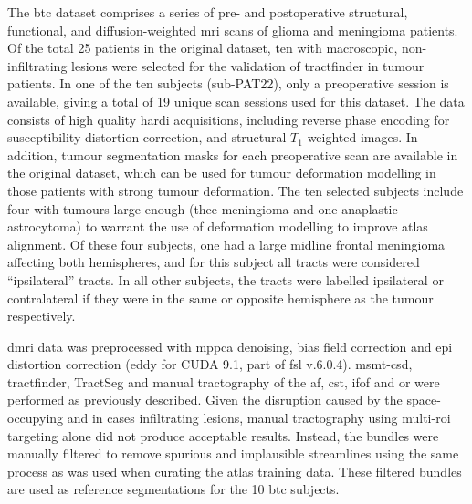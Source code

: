 The \gls{btc} dataset\autocite{Aerts2020a,Aerts2022a,Aerts2022} comprises a series of pre- and postoperative structural, functional, and diffusion-weighted \gls{mri} scans of glioma and meningioma patients.
Of the total 25 patients in the original dataset, ten with macroscopic, non-infiltrating lesions were selected for the validation of tractfinder in tumour patients.
In one of the ten subjects (sub-PAT22), only a preoperative session is available, giving a total of 19 unique scan sessions used for this dataset.
The data consists of high quality \gls{hardi} acquisitions, including reverse phase encoding for susceptibility distortion correction, and structural $T_1$-weighted images.
In addition, tumour segmentation masks for each preoperative scan are available in the original dataset, which can be used for tumour deformation modelling in those patients with strong tumour deformation.
The ten selected subjects include four with tumours large enough (thee meningioma and one anaplastic astrocytoma) to warrant the use of deformation modelling to improve atlas alignment.
Of these four subjects, one had a large midline frontal meningioma affecting both hemispheres, and for this subject all tracts were considered ``ipsilateral'' tracts.
In all other subjects, the tracts were labelled ipsilateral or contralateral if they were in the same or opposite hemisphere as the tumour respectively.

\Gls{dmri} data was preprocessed with \gls{mppca} denoising, bias field correction and \gls{epi} distortion correction (eddy for CUDA 9.1, part of \gls{fsl} v.6.0.4).
\Gls{msmt}-\gls{csd}, tractfinder, TractSeg and manual tractography of the \gls{af}, \gls{cst}, \gls{ifof} and \gls{or} were performed as previously described.
Given the disruption caused by the space-occupying and in cases infiltrating lesions, manual tractography using multi-\gls{roi} targeting alone did not produce acceptable results.
Instead, the bundles were manually filtered to remove spurious and implausible streamlines using the same process as was used when curating the atlas training data.
These filtered bundles are used as reference segmentations for the 10 \gls{btc} subjects.

